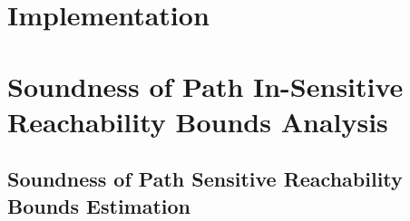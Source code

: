 \section{Implementation}
\label{appendix:implementation}


\section{Soundness of Path In-Sensitive Reachability Bounds Analysis}
\label{apdx:reachability_soundness}

\clearpage

\subsection{Soundness of Path Sensitive Reachability Bounds Estimation}
\label{apdx:ps_reachability_soundness}

\clearpage